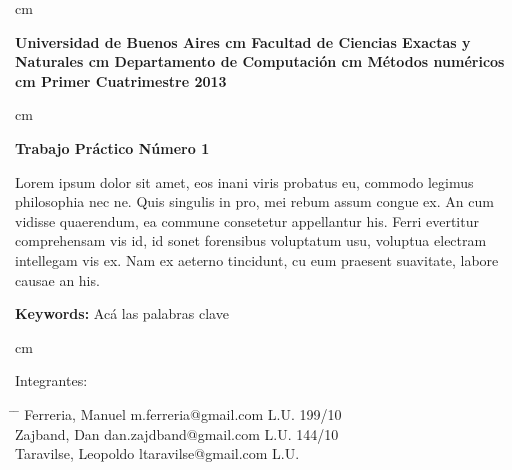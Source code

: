  cm
\begin{flushright}
\huge\bf Universidad de Buenos Aires
 cm
\Large\bf Facultad de Ciencias Exactas y Naturales
 cm
\Large\bf Departamento de Computaci\'on
 cm
\Large\bf  M\'etodos num\'ericos
 cm
\Large\bf Primer Cuatrimestre 2013
\end{flushright}

 cm
\begin{center}
\LARGE\bf Trabajo Pr\'actico N\'umero 1

\vskip 1.0cm
\normalsize Lorem ipsum dolor sit amet, eos inani viris probatus eu, commodo legimus philosophia nec ne. Quis singulis in pro, mei rebum assum congue ex. An cum vidisse quaerendum, ea commune consetetur appellantur his. Ferri evertitur comprehensam vis id, id sonet forensibus voluptatum usu, voluptua electram intellegam vis ex. Nam ex aeterno tincidunt, cu eum praesent suavitate, labore causae an his.

\vskip 1.0cm
\large {\bf Keywords:} Ac\'a las palabras clave

\end{center}



 cm
\begin{flushleft}
\large Integrantes:
\begin{tabbing}
\hspace{5cm} \= \hspace{5.5cm} \= \hspace{3cm} \kill
Ferreria, Manuel \> m.ferreria@gmail.com \> L.U. 199/10  \\
Zajband, Dan \> dan.zajdband@gmail.com \> L.U. 144/10 \\
Taravilse, Leopoldo \> ltaravilse@gmail.com \> L.U.\\
\end{tabbing}
\end{flushleft}
